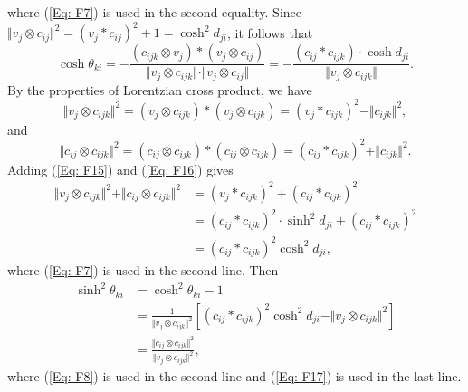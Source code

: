\documentclass[12pt]{amsart}
\theoremstyle{definition}
\begin{document}
where (\ref{Eq: F7}) is used in the second equality.
Since $\Vert v_j\otimes c_{ij}\Vert ^2=(v_j\ast c_{ij})^2+1=\cosh^2 d_{ji}$, it follows that
\begin{equation}\label{Eq: F8}
\cosh \theta_{ki}=-\frac{(c_{ijk}\otimes v_j)\ast(v_j\otimes c_{ij})}{\Vert v_j\otimes c_{ijk}\Vert \cdot\Vert v_j\otimes c_{ij}\Vert }
=-\frac{(c_{ij}\ast c_{ijk})\cdot \cosh d_{ji}}{\Vert v_j\otimes c_{ijk}\Vert }.
\end{equation}
By the properties of Lorentzian cross product, we have
\begin{equation}\label{Eq: F15}
\Vert v_j\otimes c_{ijk}\Vert ^2=(v_j\otimes c_{ijk})*(v_j\otimes c_{ijk})
=(v_j\ast c_{ijk})^2-\Vert c_{ijk}\Vert ^2,
\end{equation}
and
\begin{equation}\label{Eq: F16}
\Vert c_{ij}\otimes c_{ijk}\Vert ^2=(c_{ij}\otimes c_{ijk})*(c_{ij}\otimes c_{ijk})
=(c_{ij}\ast c_{ijk})^2+\Vert c_{ijk}\Vert ^2.
\end{equation}
Adding (\ref{Eq: F15}) and (\ref{Eq: F16}) gives
\begin{equation}\label{Eq: F17}
\begin{aligned}
\Vert v_j\otimes c_{ijk}\Vert ^2+\Vert c_{ij}\otimes c_{ijk}\Vert ^2
&=(v_j\ast c_{ijk})^2+(c_{ij}\ast c_{ijk})^2\\
&=(c_{ij}\ast c_{ijk})^2\cdot\sinh^2 d_{ji}+(c_{ij}\ast c_{ijk})^2\\
&=(c_{ij}\ast c_{ijk})^2\cosh^2 d_{ji},
\end{aligned}
\end{equation}
where (\ref{Eq: F7}) is used in the second line.
Then
\begin{equation}\label{Eq: F9}
\begin{aligned}
\sinh^2 \theta_{ki}
&=\cosh^2 \theta_{ki}-1\\
&=\frac{1}{\Vert v_j\otimes c_{ijk}\Vert ^2}[(c_{ij}\ast c_{ijk})^2\cosh^2 d_{ji}-\Vert v_j\otimes c_{ijk}\Vert ^2]\\
&=\frac{\Vert c_{ij}\otimes c_{ijk}\Vert ^2}{\Vert v_j\otimes c_{ijk}\Vert ^2},
\end{aligned}
\end{equation}
where (\ref{Eq: F8}) is used in the second line and (\ref{Eq: F17}) is used in the last line.
\end{document}
